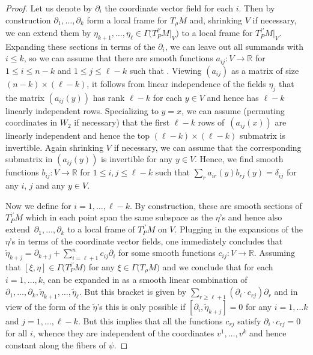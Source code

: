 \documentclass[10pt,a4paper]{amsart}
\numberwithin{equation}{section}
\def\Bbb{\mathbb}
\newcommand{\x}{\times}
\newcommand{\Ga}{\Gamma}
\begin{document}
\begin{proof}
Let us denote by $\partial_i$ the coordinate vector field
 for each $i$. Then by construction
$\partial_1,\dots,\partial_k$ form a local frame for $T_\rho M$ and, shrinking $V$ if
necessary, we can extend them by $\eta_{k+1},\dots,\eta_{\ell}\in\Ga\bigl(T^{i'}_PM|_V\bigr)$
to a local frame for $T^{i'}_PM|_V$. Expanding these sections in terms of the
$\partial_i$, we can leave out all summands with $i\leq k$, so we can assume that
there are smooth functions $a_{ij}\colon V\to\Bbb R$ for $1\leq i\leq n-k$ and
$1\leq j\leq\ell-k$ such that
. Viewing $(a_{ij})$ as a matrix of
size $(n-k)\x (\ell-k)$, it follows from linear independence of the fields $\eta_j$
that the matrix $(a_{ij}(y))$ has rank $\ell-k$ for each $y\in V$ and hence has
$\ell-k$ linearly independent rows. Specializing to $y=x$, we can assume (permuting
coordinates in $W_2$ if necessary) that the first $\ell-k$ rows of~$(a_{ij}(x))$ are
linearly independent and hence the top $(\ell-k)\x(\ell-k)$ submatrix is
invertible. Again shrinking $V$ if necessary, we can assume that the corresponding
submatrix in $(a_{ij}(y))$ is invertible for any $y\in V$. Hence, we find smooth
functions $b_{ij}\colon V\to\Bbb R$ for $1\leq i,j\leq \ell-k$ such that
$\sum_r a_{ir}(y)b_{rj}(y)=\delta_{ij}$ for any $i$, $j$ and any $y\in V$.

Now we define  for
$i=1,\dots,\ell-k$. By construction, these are smooth sections of $T^{i'}_PM$ which in
each point span the same subspace as the $\eta$'s and hence also extend~$\partial_1,\dots,\partial_k$
to a local frame of $T^{i'}_PM$ on $V$. Plugging in the
expansions of the $\eta$'s in terms of the coordinate vector fields, one immediately
concludes that $\tilde\eta_{k+j}=\partial_{k+j}+\sum_{i=\ell+1}^nc_{ij}\partial_i$
for some smooth functions $c_{ij}\colon V\to\Bbb R$. Assuming that
$[\xi,\eta]\in\Ga\bigl(T^{i'}_PM\bigr)$ for any $\xi\in\Ga\bigl(T_\rho M\bigr)$ and
\smash{$\eta\in\Ga\bigl(T^{i'}_PM\bigr)$} we conclude that for each $i=1,\dots,k$,
 can be expanded in as a smooth linear combination of
$\partial_1,\dots,\partial_k,\tilde\eta_{k+1},\dots,\tilde\eta_{\ell}$. But this
bracket is given by $\sum_{r\geq\ell+1}(\partial_i\cdot c_{rj})\partial_r$ and in
view of the form of the $\tilde\eta$'s this is only possible if
$[\partial_i,\tilde\eta_{k+j}]=0$ for any $i=1,\dots k$ and $j=1,\dots,\ell-k$. But
this implies that all the functions $c_{rj}$ satisfy $\partial_i\cdot c_{rj}=0$ for
all $i$, whence they are independent of the coordinates $v^1,\dots,v^k$ and hence
constant along the fibers of $\psi$.


\end{proof}
\end{document}
